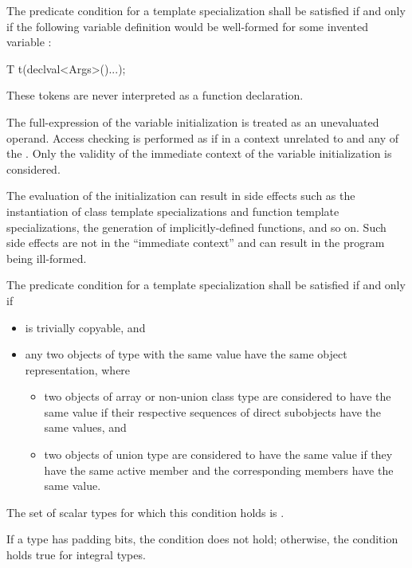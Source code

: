 %
\pnum
The predicate condition for a template specialization
 shall be satisfied if and only if the
following variable definition would be well-formed for some invented variable :

\begin{codeblock}
T t(declval<Args>()...);
\end{codeblock}

\begin{note}
These tokens are never interpreted as a function declaration.
\end{note}
The full-expression of the variable initialization is
treated as an unevaluated operand.
Access checking is performed as if in a context unrelated to 
and any of the . Only the validity of the immediate context of the
variable initialization is considered.
\begin{note}
The evaluation of the
initialization can result in side effects such as the instantiation of class
template specializations and function template specializations, the generation
of implicitly-defined functions, and so on. Such side effects are not in the
``immediate context'' and can result in the program being ill-formed.
\end{note}

%
\pnum
The predicate condition for a template specialization
shall be satisfied if and only if
\begin{itemize}
\item {} is trivially copyable, and
\item any two objects of type  with the same value
have the same object representation, where
\begin{itemize}
\item two objects of array or non-union class type are considered to have the same value
if their respective sequences of direct subobjects have the same values, and
\item two objects of union type are considered to have the same value
if they have the same active member and the corresponding members have the same value.
\end{itemize}
\end{itemize}
The set of scalar types for which this condition holds is
.
\begin{note}
If a type has padding bits, the condition does not hold;
otherwise, the condition holds true for integral types.
\end{note}

